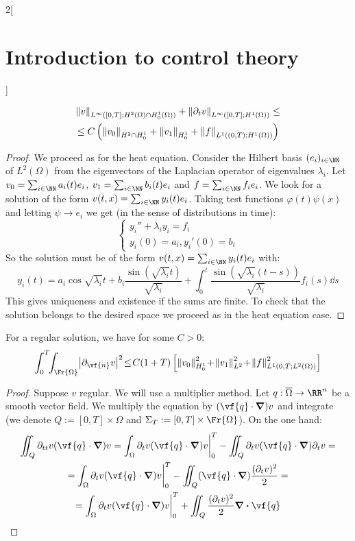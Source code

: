 \documentclass[../../../main_math.tex]{subfiles}
\begin{document}
\begin{multicols}{2}[\section{Introduction to control theory}]
\begin{theorem}
    \begin{multline*}
      \norm{v}_{L^\infty([0,T]; H^2(\Omega)\cap H_0^1(\Omega))}+\norm{\partial_t v}_{L^\infty([0,T]; H^1(\Omega))}\leq \\\leq C\left(\norm{v_0}_{H^2\cap H_0^1}+\norm{v_1}_{H_0^1}+ \norm{f}_{L^1((0,T); H^1(\Omega))}\right)
    \end{multline*}
  \end{theorem}
  \begin{proof}
    We proceed as for the heat equation. Consider the Hilbert basis $(e_i)_{i\in\NN}$ of $L^2(\Omega)$ from the eigenvectors of the Laplacian operator of eigenvalues $\lambda_i$. Let $v_0=\sum_{i\in\NN} a_i(t) e_i$, $v_1=\sum_{i\in\NN}b_i(t)e_i$ and $f=\sum_{i\in\NN} f_i e_i$. We look for a solution of the form $v(t,x)=\sum_{i\in\NN} y_i(t)e_i$. Taking test functions $\varphi(t)\psi(x)$ and letting $\psi\to e_i$ we get (in the sense of distributions in time):
    $$
      \begin{cases}
        y_i''+\lambda_i y_i = f_i \\
        y_i(0)=a_i, y_i'(0)=b_i
      \end{cases}
    $$
    So the solution must be of the form $v(t,x)=\sum_{i\in\NN} y_i(t)e_i$ with:
    $$
      y_i(t)\!=\!a_i \cos{\!\sqrt{\lambda_i}t}+b_i\frac{\sin(\sqrt{\lambda_i}t)}{\sqrt{\lambda_i}}+\!\int_0^t\!\frac{\sin(\sqrt{\lambda_i}(t\!-\!s))}{\sqrt{\lambda_i}}f_i(s)\dd s
    $$
    This gives uniqueness and existence if the sums are finite. To check that the solution belongs to the desired space we proceed as in the heat equation case.
  \end{proof}
  \begin{theorem}\label{ICT:hiddenregularity}
    For a regular solution, we have for some $C>0$:
    $$
      \int_0^T\!\!\int_{\Fr{\Omega}}\! \abs{\partial_{\vf{n}}v}^2\! \leq\! C(1+T)\left[\norm{v_0}_{H_0^1}^2\!+\!\norm{v_1}_{L^2}^2\!+\!\norm{f}_{L^1(0,T;L^2(\Omega))}^2\right]
    $$
  \end{theorem}
  \begin{proof}
    Suppose $v$ regular. We will use a multiplier method. Let $q:\overline{\Omega}\to \RR^n$ be a smooth vector field. We multiply the equation by $(\vf{q}\cdot \grad) v$ and integrate (we denote $Q:=[0,T]\times \Omega$ and $\Sigma_T:=[0,T]\times \Fr{\Omega}$). On the one hand:
    \begin{multline*}
      \iint_Q \partial_{tt} v (\vf{q}\cdot \grad) v = \int_\Omega\partial_tv (\vf{q}\cdot \grad) v\bigg|_0^T - \iint_Q \partial_t v (\vf{q}\cdot \grad) \partial_t v =\\=  \int_\Omega\partial_tv (\vf{q}\cdot \grad) v\bigg|_0^T - \iint_Q (\vf{q}\cdot \grad) \frac{(\partial_t v)^2}{2} =\\= \int_\Omega\partial_tv (\vf{q}\cdot \grad) v\bigg|_0^T + \iint_Q \frac{(\partial_t v)^2}{2} \div \vf{q}

\end{multline*}
\end{proof}
\end{multicols}
\end{document}
